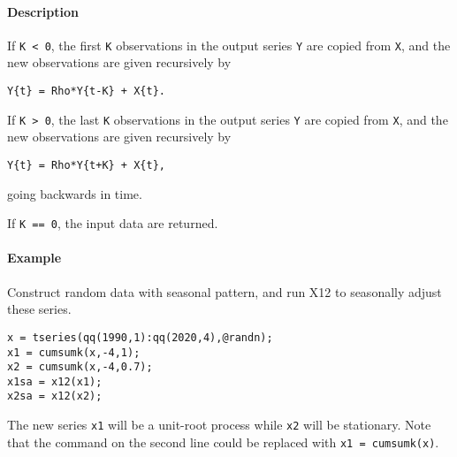\paragraph{Description}

If \texttt{K \textless{} 0}, the first \texttt{K} observations in the
output series \texttt{Y} are copied from \texttt{X}, and the new
observations are given recursively by

\begin{verbatim}
Y{t} = Rho*Y{t-K} + X{t}.
\end{verbatim}

If \texttt{K \textgreater{} 0}, the last \texttt{K} observations in the
output series \texttt{Y} are copied from \texttt{X}, and the new
observations are given recursively by

\begin{verbatim}
Y{t} = Rho*Y{t+K} + X{t},
\end{verbatim}

going backwards in time.

If \texttt{K == 0}, the input data are returned.

\paragraph{Example}

Construct random data with seasonal pattern, and run X12 to seasonally
adjust these series.

\begin{verbatim}
x = tseries(qq(1990,1):qq(2020,4),@randn);
x1 = cumsumk(x,-4,1);
x2 = cumsumk(x,-4,0.7);
x1sa = x12(x1);
x2sa = x12(x2);
\end{verbatim}

The new series \texttt{x1} will be a unit-root process while \texttt{x2}
will be stationary. Note that the command on the second line could be
replaced with \texttt{x1 = cumsumk(x)}.


